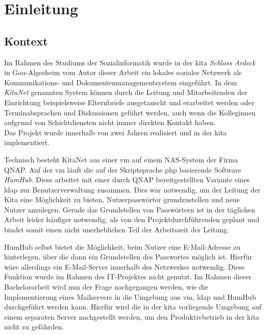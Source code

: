 
\setcounter{page}{1}

\chapter{Einleitung}
\label{sec:Einleitung}
\section{Kontext}
Im Rahmen des Studiums der Sozialinformatik wurde in der \ac{kita} \textit{Schloss Ardeck} in Gau-Algesheim vom Autor dieser Arbeit ein lokales soziales Netzwerk als Kommunikations- und Dokumentenmanagementsystem eingeführt. In dem \textit{KitaNet} genannten System können durch die Leitung und Mitarbeitenden der Einrichtung beispielsweise Elternbriefe ausgetauscht und erarbeitet werden oder Terminabsprachen und Diskussionen geführt werden, auch wenn die Kolleginnen aufgrund von Schichtdiensten nicht immer direkten Kontakt haben. \\ Das Projekt wurde innerhalb von zwei Jahren realisiert und in der \ac{kita} implementiert.

Technisch besteht KitaNet aus einer \ac{vm} auf einem NAS-System der Firma QNAP. Auf der \ac{vm} läuft die auf der Skriptsprache \ac{php} basierende Software \textit{HumHub}. Diese arbeitet mit einer durch QNAP bereitgestellten Variante eines \ac{ldap} zur Benutzerverwaltung zusammen. Dies war notwendig, um der Leitung der Kita eine Möglichkeit zu bieten, Nutzerpasswörter grundzustellen und neue Nutzer anzulegen. Gerade das Grundstellen von Passwörtern ist in der täglichen Arbeit leider häufiger notwendig, als von den Projektdurchführenden geplant und bindet somit einen nicht unerheblichen Teil der Arbeitszeit der Leitung.

HumHub selbst bietet die Möglichkeit, beim Nutzer eine E-Mail-Adresse zu hinterlegen, über die dann ein Grundstellen des Passwortes möglich ist. Hierfür wäre allerdings ein E-Mail-Server innerhalb des Netzwerkes notwendig. Diese Funktion wurde im Rahmen des IT-Projektes nicht genutzt. Im Rahmen dieser Bachelorarbeit wird nun der Frage nachgegangen werden, wie die Implementierung eines Mailservers in die Umgebung aus \ac{vm}, \ac{ldap} und HumHub durchgeführt werden kann. Hierfür wird die in der \ac{kita} vorliegende Umgebung auf einem separaten Server nachgestellt werden, um den Produktivbetrieb in der \ac{kita} nicht zu gefährden.

